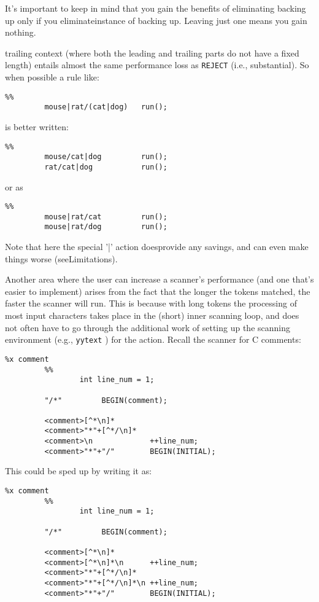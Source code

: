 \documentclass[openany,oneside]{book}
\begin{document}
It's important to keep in mind that you gain the benefits of eliminating
backing up only if you eliminateinstance of backing up. 
Leaving just one means you gain nothing.

trailing context (where both the leading and trailing
parts do not have a fixed length) entails almost the same performance
loss as \verb`REJECT` (i.e., substantial).  So when possible a rule
like:


\begin{verbatim}
%%
         mouse|rat/(cat|dog)   run();
\end{verbatim}


is better written:
\begin{verbatim}
%%
         mouse/cat|dog         run();
         rat/cat|dog           run();
\end{verbatim}


or as
\begin{verbatim}
%%
         mouse|rat/cat         run();
         mouse|rat/dog         run();
\end{verbatim}


Note that here the special '|' action doesprovide any
savings, and can even make things worse (seeLimitations).

Another area where the user can increase a scanner's performance (and
one that's easier to implement) arises from the fact that the longer the
tokens matched, the faster the scanner will run.  This is because with
long tokens the processing of most input characters takes place in the
(short) inner scanning loop, and does not often have to go through the
additional work of setting up the scanning environment (e.g., \verb`yytext` ) for the action.  Recall the scanner for C comments:


\begin{verbatim}
%x comment
         %%
                 int line_num = 1;
     
         "/*"         BEGIN(comment);
     
         <comment>[^*\n]*
         <comment>"*"+[^*/\n]*
         <comment>\n             ++line_num;
         <comment>"*"+"/"        BEGIN(INITIAL);
\end{verbatim}


This could be sped up by writing it as:
\begin{verbatim}
%x comment
         %%
                 int line_num = 1;
     
         "/*"         BEGIN(comment);
     
         <comment>[^*\n]*
         <comment>[^*\n]*\n      ++line_num;
         <comment>"*"+[^*/\n]*
         <comment>"*"+[^*/\n]*\n ++line_num;
         <comment>"*"+"/"        BEGIN(INITIAL);
\end{verbatim}
\end{document}
